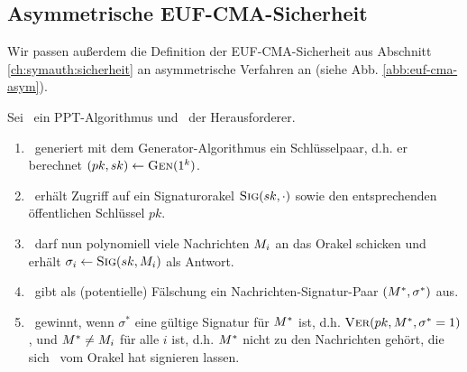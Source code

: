 \subsection{Asymmetrische EUF-CMA-Sicherheit} Wir passen außerdem die
Definition der EUF-CMA-Sicherheit aus Abschnitt
\ref{ch:symauth:sicherheit} an asymmetrische Verfahren an (siehe
Abb. \ref{abb:euf-cma-asym}).


\begin{definition}\indexEUFCMA Sei \A~ein PPT-Algorithmus und \C~der
  Herausforderer.
  \begin{enumerate}
  \item \C~generiert mit dem Generator-Algorithmus ein Schlüsselpaar,
    d.h. er berechnet $(pk, sk) \leftarrow \textsc{Gen}(1^k)$.
  \item \A~erhält Zugriff auf ein Signaturorakel $\textsc{Sig}(sk, \cdot)$ sowie den
    entsprechenden öffentlichen Schlüssel $pk$.
  \item \A~darf nun polynomiell viele Nachrichten $M_i$ an das
    Orakel schicken und erhält $\sigma_i \leftarrow \textsc{Sig}(sk, M_i)$ als
    Antwort.
  \item \A~gibt als (potentielle) Fälschung ein Nachrichten-Signatur-Paar
    $(M^*,\sigma^*)$ aus.
  \item \A~gewinnt, wenn $\sigma^*$ eine gültige Signatur für $M^*$
    ist, d.h. $\textsc{Ver}(pk, M^*, \sigma^* = 1)$, und $M^* \neq
    M_i$ für alle $i$ ist, d.h. $M^*$ nicht zu den Nachrichten
    gehört, die sich \A~vom Orakel hat signieren lassen.
  \end{enumerate}

  \begin{figure}
    \begin{center} 
\end{center}
\end{figure}
\end{definition}
